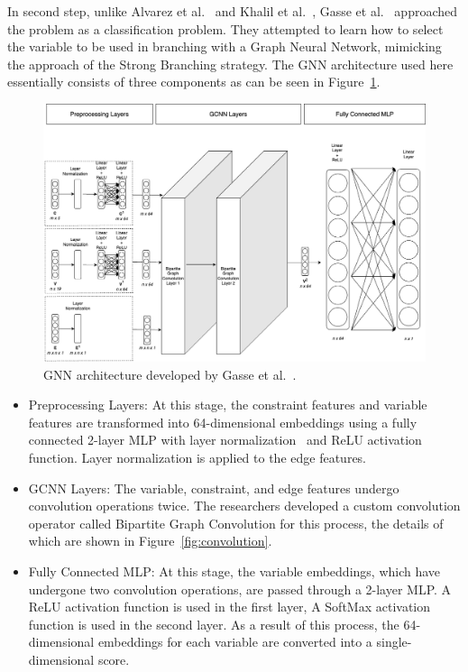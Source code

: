 In second step, unlike Alvarez et al.~\cite{alvarezMachineLearningBasedApproximation2017} and Khalil et al.~\cite{khalilLearningBranchMixed2016}, Gasse et al.~\cite{gasseExactCombinatorialOptimization2019} approached the problem as a classification problem.
They attempted to learn how to select the variable to be used in branching with a Graph Neural Network, mimicking the approach of the Strong Branching strategy.
The GNN architecture used here essentially consists of three components as can be seen in Figure~\ref{fig:gcnn}.

\begin{figure}[htb!]
    \centering
    \includegraphics[width=1\textwidth]{figures/GCNN}
    \caption{GNN architecture developed by Gasse et al.~\cite{gasseExactCombinatorialOptimization2019}.}
    \label{fig:gcnn}
\end{figure}


\begin{itemize}
  \item Preprocessing Layers: At this stage, the constraint features and variable features are transformed into 64-dimensional embeddings using a fully connected 2-layer MLP with layer normalization~\cite{baLayerNormalization2016} and ReLU activation function.
  Layer normalization is applied to the edge features.
  \item GCNN Layers: The variable, constraint, and edge features undergo convolution operations twice.
  The researchers developed a custom convolution operator called Bipartite Graph Convolution for this process, the details of which are shown in Figure~\ref{fig:convolution}.
  \item Fully Connected MLP: At this stage, the variable embeddings, which have undergone two convolution operations, are passed through a 2-layer MLP.
  A ReLU activation function is used in the first layer, A SoftMax activation function is used in the second layer.
  As a result of this process, the 64-dimensional embeddings for each variable are converted into a single-dimensional score.
\end{itemize}


